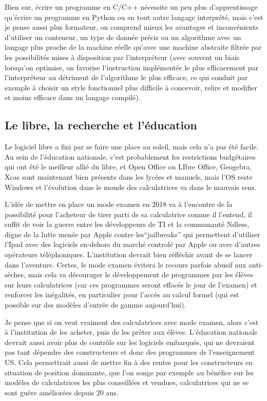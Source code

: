 \documentclass[a4paper,11pt]{article}
\begin{document}
\begin{giacjshere}
Bien sur, \'ecrire un programme en C/C++ n\'ecessite
un peu plus d'apprentissage qu'\'ecrire un programme
en Python ou en tout autre langage interpr\'et\'e,
mais c'est je pense aussi plus formateur, on
comprend mieux les avantages et inconv\'enients
d'utiliser un conteneur, un type de donn\'ee pr\'ecis
ou un algorithme avec un langage plus proche de la machine
r\'eelle qu'avec une machine abstraite filtr\'ee par les
possibilit\'es mises \`a disposition par l'interpr\'eteur
(avec souvent un biais lorsqu'on optimise, on favorise
l'instruction impl\'ement\'ee le plus efficacement par
l'interpr\'eteur au d\'etriment de l'algorithme le plus
efficace, ce qui conduit par exemple \`a choisir un style fonctionnel
plus difficile \`a concevoir, relire et modifier et moins
efficace dans un langage compil\'e).


\subsection{Le libre, la recherche et l'\'education}
Le logiciel libre a fini par se faire une place au soleil,
mais cela n'a pas \'et\'e facile. Au sein de l'\'education
nationale, c'est probablement les restrictions budg\'etaires qui ont \'et\'e
le meilleur alli\'e du libre, et Open Office ou LIbre Office,
Geogebra, Xcas sont maintenant bien pr\'esents dans
les lyc\'ees et manuels, mais l'OS reste Windows et
l'\'evolution dans le monde des calculatrices va dans le mauvais sens.

L'id\'ee de mettre en place un mode examen en 2018 va \`a l'encontre
de la possibilit\'e pour l'acheteur de tirer parti de sa calculatrice
comme il l'entend, il suffit de voir la guerre entre les
d\'eveloppeurs de TI et la communaut\'e Ndless, digne
de la lutte men\'ee par Apple contre les``jailbreaks''
qui permettent d'utiliser l'Ipad avec des logiciels en-dehors
du march\'e control\'e par Apple ou avec d'autres op\'erateurs
t\'el\'ephoniques. L'institution devrait bien r\'efl\'echir avant de
se lancer dans l'aventure. Certes, le mode examen \'evitera le
recours parfois abusif aux anti-s\`eches, mais cela va d\'ecourager
le d\'eveloppement de programmes par les \'el\`eves sur leurs
calculatrices (car ces programmes seront effac\'es le jour de
l'examen) et renforcer les in\'egalit\'es, en particulier pour
l'acc\`es au calcul formel (qui est possible sur des mod\`eles
d'entr\'ee de gamme aujourd'hui).

Je pense que si on veut vraiment des calculatrices avec mode examen,
alors c'est \`a l'institution de les acheter, puis de les 
pr\^eter aux \'el\`eves. L'\'education nationale devrait aussi
avoir plus de contr\^ole sur les logiciels
embarqu\'es, qui ne devraient pas tant
d\'ependre des constructeurs
et donc des programmes de l'enseignement US. Cela permettrait
aussi de mettre fin \`a des rentes pour les constructeurs
en situation de position dominante, que l'on songe par
exemple au b\'en\'efice sur les mod\`eles de calculatrices les plus
conseill\'ees et vendues, calculatrices qui ne se sont
gu\`ere am\'elior\'ees depuis 20 ans.


\end{giacjshere}
\end{document}
